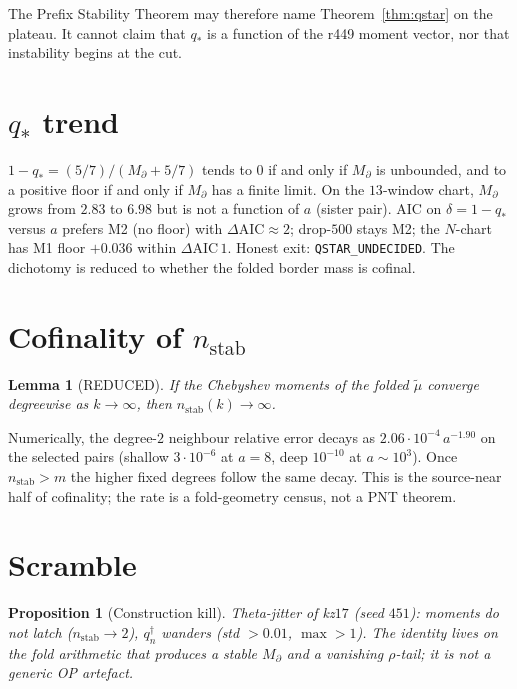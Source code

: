 \documentclass[11pt]{article}
\newtheorem{lemma}{Lemma}
\newtheorem{prop}{Proposition}
\begin{document}
The Prefix Stability Theorem may therefore
name Theorem~\ref{thm:qstar} on the
plateau.
It cannot claim that $q_*$ is a function of
the r449 moment vector, nor that instability
begins at the cut.

\section{$q_*$ trend}\label{sec:qstar}

$1-q_*=(5/7)/(M_\partial+5/7)$ tends to $0$
if and only if $M_\partial$ is unbounded,
and to a positive floor if and only if
$M_\partial$ has a finite limit.
On the $13$-window chart, $M_\partial$ grows
from $2.83$ to $6.98$ but is not a function
of $a$ (sister pair).
AIC on $\delta=1-q_*$ versus $a$ prefers M2
(no floor) with $\Delta\mathrm{AIC}\approx 2$;
drop-$500$ stays M2; the $N$-chart has
M1 floor $+0.036$ within $\Delta\mathrm{AIC}\,1$.
Honest exit: \texttt{QSTAR\_UNDECIDED}.
The dichotomy is reduced to whether the
folded border mass is cofinal.

\section{Cofinality of $n_{\mathrm{stab}}$}\label{sec:cof}

\begin{lemma}[REDUCED]\label{lem:cof}
If the Chebyshev moments of the folded
$\tilde\mu$ converge degreewise as
$k\to\infty$, then
$n_{\mathrm{stab}}(k)\to\infty$.
\end{lemma}

Numerically, the degree-$2$ neighbour
relative error decays as
$2.06\cdot10^{-4}\,a^{-1.90}$ on the
selected pairs
(shallow $3\cdot10^{-6}$ at $a=8$,
deep $10^{-10}$ at $a\sim10^3$).
Once $n_{\mathrm{stab}}>m$ the higher fixed
degrees follow the same decay.
This is the source-near half of cofinality;
the rate is a fold-geometry census, not a
PNT theorem.

\section{Scramble}\label{sec:scr}

\begin{prop}[Construction kill]\label{prop:scr}
Theta-jitter of kz$17$ (seed $451$):
moments do not latch ($n_{\mathrm{stab}}\to 2$),
$q^{\dagger}_n$ wanders (std $>0.01$,
$\max>1$).
The identity lives on the fold arithmetic
that produces a stable $M_\partial$ and a
vanishing $\rho$-tail; it is not a generic
OP artefact.
\end{prop}
\end{document}
